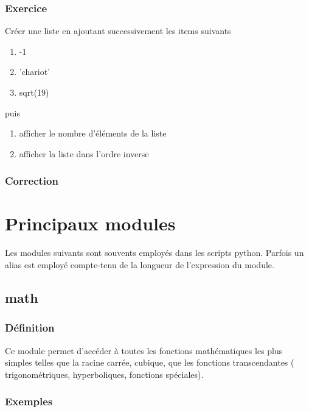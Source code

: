 \documentclass[a4paper,12pt]{article}
\begin{document}
\subsubsection{Exercice}
\begin{leftbar}
Créer une liste en ajoutant successivement les items suivants
\begin{enumerate}
\item -1
\item 'chariot'
\item sqrt(19)
\end{enumerate}
puis
\begin{enumerate}
\item afficher le nombre d'éléments de la liste 
\item afficher la liste dans l'ordre inverse
\end{enumerate}
\end{leftbar}
\subsubsection{Correction}




\clearpage
\section{Principaux modules}

Les modules suivants sont souvents employ\'es dans les scripts python. Parfois un alias est employ\'e compte-tenu de la longueur de l'expression du module.

\subsection{math}
\subsubsection{Définition}
\begin{leftbar}
Ce module permet d'accéder à toutes les fonctions mathématiques les plus simples telles que la racine carrée, cubique, que les fonctions transcendantes ( trigonométriques, hyperboliques, fonctions spéciales).
\end{leftbar}
\subsubsection{Exemples}
\end{document}
